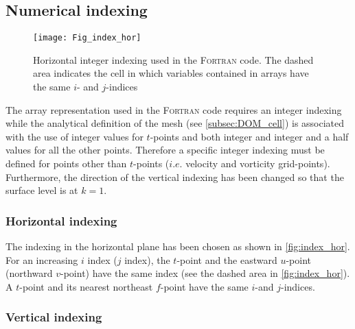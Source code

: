 \documentclass[../tex_main/NEMO_manual]{subfiles}
\begin{document}
\subsection{Numerical indexing}
\label{subsec:DOM_Num_Index}

\begin{figure}[!tb]  \begin{center}
\texttt{[image: Fig\_index\_hor]}
\caption{   \protect\label{fig:index_hor}
  Horizontal integer indexing used in the \textsc{Fortran} code.
  The dashed area indicates the cell in which variables contained in arrays have the same $i$- and $j$-indices}
\end{center}   \end{figure}

The array representation used in the \textsc{Fortran} code requires an integer indexing while
the analytical definition of the mesh (see \autoref{subsec:DOM_cell}) is associated with the use of
integer values for $t$-points and both integer and integer and a half values for all the other points.
Therefore a specific integer indexing must be defined for points other than $t$-points
($i.e.$ velocity and vorticity grid-points).
Furthermore, the direction of the vertical indexing has been changed so that the surface level is at $k=1$.

\subsubsection{Horizontal indexing}
\label{subsec:DOM_Num_Index_hor}

The indexing in the horizontal plane has been chosen as shown in \autoref{fig:index_hor}.
For an increasing $i$ index ($j$ index),
the $t$-point and the eastward $u$-point (northward $v$-point) have the same index
(see the dashed area in \autoref{fig:index_hor}).
A $t$-point and its nearest northeast $f$-point have the same $i$-and $j$-indices.

\subsubsection{Vertical indexing}
\label{subsec:DOM_Num_Index_vertical}
\end{document}
